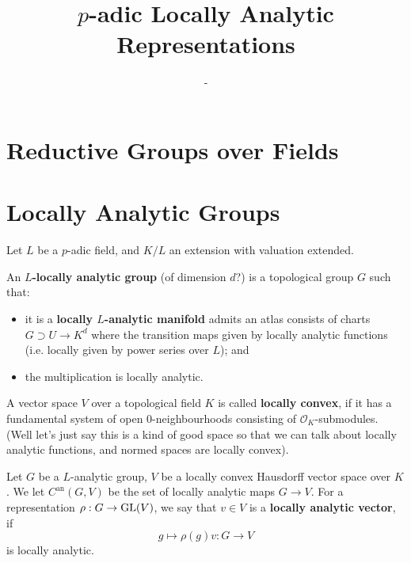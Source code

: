 \documentclass{article}
\title{$p$-adic Locally Analytic Representations}
\author{-}
\renewcommand{\O}{\mathcal{O}}
\newcommand{\an}{\mathrm{an}}
\begin{document}
\maketitle


\section{Reductive Groups over Fields}

\section{Locally Analytic Groups}
Let $L$ be a $p$-adic field, and $K/L$ an extension with valuation extended.

An $L$\textbf{-locally analytic group} (of dimension $d$?) is a topological group $G$ such that:\begin{itemize}
    \item it is a \textbf{locally $L$-analytic manifold} admits an atlas consists of charts
    $G\supset U\to K^d$ where the transition maps given by locally analytic functions (i.e. locally given by power series over $L$); and
    \item the multiplication is locally analytic.
\end{itemize}

A vector space $V$ over a topological field $K$ is called \textbf{locally convex},
if it has a
fundamental system of open 0-neighbourhoods consisting of $\O_K$-submodules.
(Well let's just say this is a kind of good space so that we can talk about locally analytic functions, and normed spaces are locally convex).

Let $G$ be a $L$-analytic group, $V$ be a locally convex Hausdorff vector space over $K$.
We let $C^{\an}(G, V)$ be the set of locally analytic maps $G\to V$.
For a representation $\rho : G\to\operatorname{GL}(V)$,
we say that $v\in V$ is a \textbf{locally analytic vector},
if \[g\mapsto\rho(g)v : G\to V\]
is locally analytic.
\end{document}
